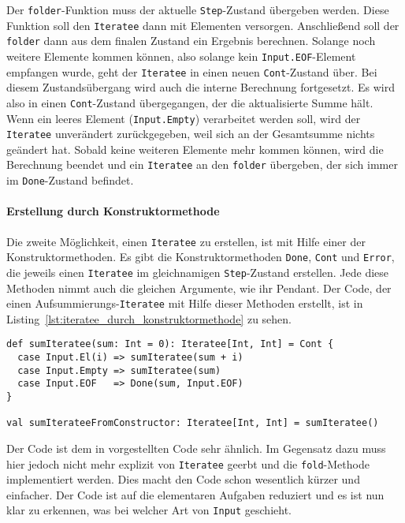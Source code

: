 Der \lstinline|folder|-Funktion muss der aktuelle \lstinline|Step|-Zustand übergeben werden.
Diese Funktion soll den \lstinline|Iteratee| dann mit Elementen versorgen.
Anschließend soll der \lstinline|folder| dann aus dem finalen Zustand ein Ergebnis berechnen.
Solange noch weitere Elemente kommen können, also solange kein \lstinline|Input.EOF|-Element empfangen wurde, geht der \lstinline|Iteratee| in einen neuen \lstinline|Cont|-Zustand über.
Bei diesem Zustandsübergang wird auch die interne Berechnung fortgesetzt.
Es wird also in einen \lstinline|Cont|-Zustand übergegangen, der die aktualisierte Summe hält.
Wenn ein leeres Element (\lstinline|Input.Empty|) verarbeitet werden soll, wird der \lstinline|Iteratee| unverändert zurückgegeben, weil sich an der Gesamtsumme nichts geändert hat.
Sobald keine weiteren Elemente mehr kommen können, wird die Berechnung beendet und ein \lstinline|Iteratee| an den \lstinline|folder| übergeben, der sich immer im \lstinline|Done|-Zustand befindet.


\paragraph{Erstellung durch Konstruktormethode} %
\label{par:erstellung_durch_konstruktormethode}\mbox{} %

Die zweite Möglichkeit, einen \lstinline|Iteratee| zu erstellen, ist mit Hilfe einer der Konstruktormethoden.
Es gibt die Konstruktormethoden \lstinline|Done|, \lstinline|Cont| und \lstinline|Error|, die jeweils einen \lstinline|Iteratee| im gleichnamigen \lstinline|Step|-Zustand erstellen.
Jede diese Methoden nimmt auch die gleichen Argumente, wie ihr Pendant.
Der Code, der einen Aufsummierungs-\lstinline|Iteratee| mit Hilfe dieser Methoden erstellt, ist in Listing~\ref{lst:iteratee_durch_konstruktormethode} zu sehen.

\begin{lstlisting}[caption=Erstellung eines Iteratees durch eine Konstruktormethode, label=lst:iteratee_durch_konstruktormethode]
def sumIteratee(sum: Int = 0): Iteratee[Int, Int] = Cont {
  case Input.El(i) => sumIteratee(sum + i)
  case Input.Empty => sumIteratee(sum)
  case Input.EOF   => Done(sum, Input.EOF)
}

val sumIterateeFromConstructor: Iteratee[Int, Int] = sumIteratee()
\end{lstlisting}

Der Code ist dem in  vorgestellten Code sehr ähnlich.
Im Gegensatz dazu muss hier jedoch nicht mehr explizit von \lstinline|Iteratee| geerbt und die \lstinline|fold|-Methode implementiert werden.
Dies macht den Code schon wesentlich kürzer und einfacher.
Der Code ist auf die elementaren Aufgaben reduziert und es ist nun klar zu erkennen, was bei welcher Art von \lstinline|Input| geschieht.

